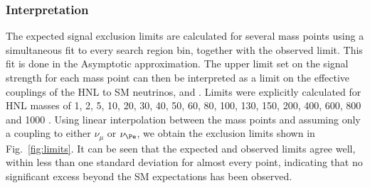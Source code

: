 \subsubsection{Interpretation}
 The expected signal exclusion limits are calculated for
 several mass points using a simultaneous fit to every search region
 bin, together with the observed limit. This fit is done in the
 Asymptotic approximation. The upper limit set on the signal strength
 for each mass point can then be interpreted as a
 limit on the effective couplings of the HNL to SM neutrinos, \mixpare
 and \mixparm. Limits were explicitly calculated for HNL masses of 1, 2, 5, 10, 20, 30, 40, 50, 60, 80, 100,
 130, 150, 200, 400, 600, 800 and 1000 \GeV. Using linear
 interpolation between the mass points and assuming only a coupling to either $\nu_{\mu}$ or $\nu_{\Pe}$,
 we obtain the exclusion limits shown in Fig.~\ref{fig:limits}. It can be seen that the expected and
 observed limits agree well, within less than one standard deviation
 for almost every point, indicating that no significant excess beyond
 the SM expectations has been observed. 
